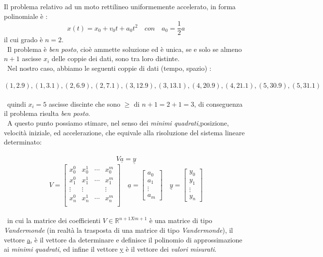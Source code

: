 Il problema relativo ad un moto rettilineo uniformemente accelerato, in forma polinomiale è :
	\[
		x(t) = x_0 + v_0t + a_0t^2 \quad con \quad a_0 = \frac{1}{2}a
	\]
il cui grado è $n=2$.\\\
Il problema è \textit{ben posto}, cioè ammette soluzione ed è unica, se e solo se almeno $n+1$ ascisse $x_i$ delle coppie dei dati, sono tra loro distinte.\\\
Nel nostro caso, abbiamo le seguenti coppie di dati (tempo, spazio) :\\\
	\[
		(1,2.9),(1,3.1),(2,6.9),(2,7.1),(3,12.9),(3,13.1),(4,20.9),(4,21.1),(5,30.9),(5,31.1)	
	\]\\\
quindi $x_i=5$ ascisse discinte che sono $\geq$ di $n+1 = 2+1 = 3$, di conseguenza il problema risulta \textit{ben posto}.\\\
A questo punto possiamo stimare, nel senso dei \textit{minimi quadrati},posizione, velocità iniziale, ed accelerazione, che equivale alla risoluzione del sistema lineare determinato:\\\
	\[
		V\underline{a}=\underline{y}
	\]
	\[
		V=\begin{bmatrix}
			x_0^0 & x_0^1 & \cdots & x_0^m \\
			x_1^0 & x_1^1 & \cdots & x_1^m \\
			\vdots & \vdots & & \vdots \\
			x_n^0 & x_n^1 & \cdots & x_n^m \\		
		\end{bmatrix}
		\quad
		\underline{a}=\begin{bmatrix}
			a_0 \\
			a_1 \\
			\vdots \\
			a_m
		\end{bmatrix}
		\quad
		\underline{y}=\begin{bmatrix}
			y_0 \\
			y_1 \\
			\vdots \\
			y_n
		\end{bmatrix}
	\]\\\
in cui la matrice dei coefficienti $V \in \mathbb{R}^{n+1Xm+1}$ è una matrice di tipo \textit{Vandermonde} (in realtà la trasposta di una matrice di tipo \textit{Vandermonde}), il vettore \underline{a}, è il vettore  da determinare e definisce il polinomio di approssimazione ai \textit{minimi quadrati}, ed infine il vettore \underline{y} è il vettore dei \textit{valori misurati}.\\\
